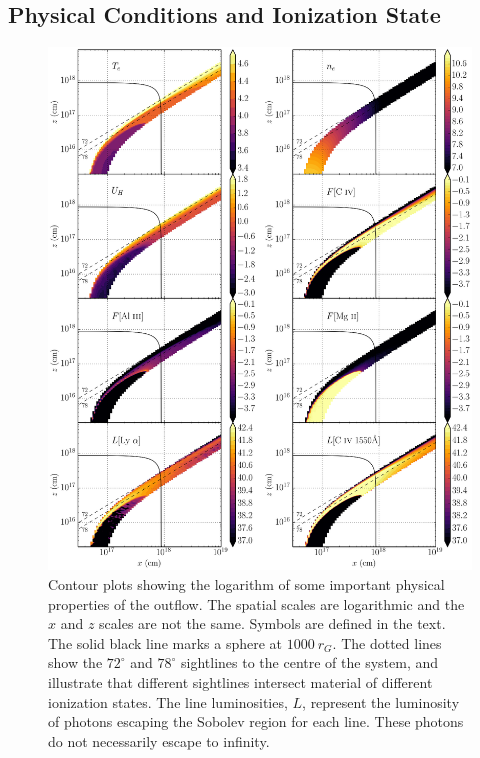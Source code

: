 \documentclass[useAMS,usenatbib]{mn2e_x}
\begin{document}
\subsection{Physical Conditions and Ionization State}


\begin{figure}
\centering
\includegraphics[width=1.0\textwidth]{figures/fig2.eps}
\caption
{
Contour plots showing the logarithm of some important 
physical properties of the outflow. The spatial scales are
logarithmic and the $x$ and $z$ scales are not the same.
Symbols are defined in the text.
The solid black line marks a sphere at $1000~r_G$.
The dotted lines show the $72^\circ$ and $78^\circ$ sightlines 
to the centre of the system, and illustrate that different sightlines
intersect material of different ionization states.
The line luminosities, $L$, represent the luminosity of photons
escaping the Sobolev region for each line. These photons do not
necessarily escape to infinity.
}
\label{fig:wind}
\end{figure}
\end{document}
